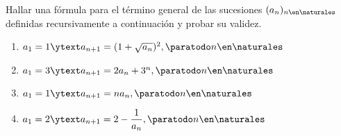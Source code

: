 \begin{enunciado}{\ejercicio}
  Hallar una fórmula para el término general de las sucesiones $(a_n)_{n \en \naturales }$ definidas recursivamente a
  continuación y probar su validez.
  \begin{multicols}{2}
    \begin{enumerate}[label=\roman*)]
      \item $a_1 = 1  \ytext  a_{n+1} = (1 +\sqrt{a_n})^2, \paratodo n \en \naturales $
      \item $a_1 = 3  \ytext  a_{n+1} = 2a_n + 3^n, \paratodo n \en \naturales $
      \item $a_1 = 1  \ytext  a_{n+1} = na_n, \paratodo n \en \naturales $
      \item $a_1 = 2  \ytext  a_{n+1} = 2 - \displaystyle \frac{1}{a_n}, \paratodo n \en \naturales $
    \end{enumerate}
  \end{multicols}
\end{enunciado}

